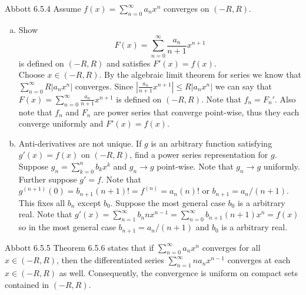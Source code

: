 \documentclass[12pt]{article}
\makeatletter
\theoremstyle{homework}
\newenvironment{exercise}[1]
{\def\@currentlabel{#1}\exercisecore}
{\endexercisecore}
\makeatother
\begin{document}
\begin{exercise}
5
Abbott 6.5.4
\end{exercise}
Assume $f(x) = \sum_{n=0}^\infty a_n x^n$ converges on $(-R,R)$.
\begin{enumerate}[(a)] 
\item Show $$F(x) = \sum_{n=0}^\infty \frac{a_n}{n+1}x^{n+1}$$ is defined on $(-R,R)$ and satisfies $F'(x)=f(x)$.\\
Choose $x\in(-R,R)$.  By the algebraic limit theorem for series we know that $\sum_{n=0}^\infty R|a_n x^n|$ converges.  Since $|\frac{a_n}{n+1}x^{n+1}|\leq R|a_n x^n|$ we can say that $F(x) = \sum_{n=0}^\infty \frac{a_n}{n+1}x^{n+1}$ is defined on $(-R,R)$.  Note that $f_n=F_n'$.  Also note that $f_n$ and $F_n$ are power series that converge point-wise, thus they each converge uniformly and $F'(x)=f(x)$.
\item Anti-derivatives are not unique. If $g$ is an arbitrary function satisfying $g'(x) = f(x)$ on $(-R,R)$, find a power series representation for $g$.\\
Suppose $g_n=\sum_{k=0}^n b_k x^k$ and $g_n\rightarrow g$ point-wise.  Note that $g_n\rightarrow g$ uniformly.  Further suppose $g'=f$.  Note that $g^{(n+1)}(0)=b_{n+1}(n+1)!=f^{(n)}=a_{n}(n)!$ or $b_{n+1}=a_n/(n+1)$.  This fixes all $b_n$ except $b_0$.  Suppose the most general case $b_0$ is a arbitrary real.  Note that $g'(x)=\sum_{n=1}^\infty b_n nx^{n-1}=\sum_{n=0}^\infty b_{n+1} (n+1)x^{n}=f(x)$ so in the most general case $b_{n+1}=a_n/(n+1)$ and $b_0$ is a arbitrary real.
\end{enumerate}
\begin{exercise}
6
Abbott 6.5.5
\end{exercise}
Theorem 6.5.6 states that if $\sum_{n=0}^\infty a_n x^n$ converges for all $x \in (-R,R)$, then the differentiated series $\sum_{n=1}^\infty na_n x^{n-1}$ converges at each $x \in (-R,R)$ as well. Consequently, the convergence is uniform on compact sets contained in $(-R,R)$.
\end{document}
